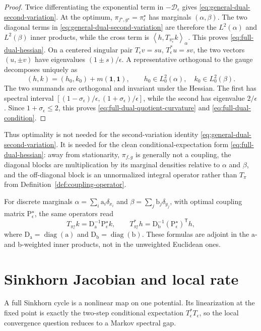 \documentclass[11pt]{article}
\theoremstyle{definition}
\theoremstyle{remark}
\newcommand{\eps}{\epsilon}
\newcommand{\one}{\mathbf{1}}
\newcommand{\al}{\alpha}
\newcommand{\be}{\beta}
\newcommand{\Dd}{\mathcal{D}}
\newcommand{\ip}[2]{\left\langle #1,#2\right\rangle}
\begin{document}
\begin{proof}
Twice differentiating the exponential term in $-\Dd_\eps$ gives
\eqref{eq:general-dual-second-variation}. At the optimum,
$\pi_{f^\star,g^\star}=\pi_\eps^\star$ has marginals $(\al,\be)$.
The two diagonal terms in \eqref{eq:general-dual-second-variation} are
therefore the $L^2(\al)$ and $L^2(\be)$ inner products, while the cross
term is $\ip{h}{T_{\pi_\eps^\star}k}_\al$. This proves
\eqref{eq:full-dual-hessian}. On a centered singular pair
$T_\eps v=s u$, $T_\eps^\ast u=s v$, the two vectors $(u,\pm v)$ have
eigenvalues $(1\pm s)/\eps$. A representative orthogonal to the gauge
decomposes uniquely as
\[
  (h,k)=(h_0,k_0)+m(\one,\one),
  \qquad
  h_0\in L_0^2(\al),\quad k_0\in L_0^2(\be).
\]
The two summands are orthogonal and invariant under the Hessian. The
first has spectral interval
$[(1-\sigma_\eps)/\eps,(1+\sigma_\eps)/\eps]$, while the second has
eigenvalue $2/\eps$. Since $1+\sigma_\eps\leq2$, this proves
\eqref{eq:full-dual-quotient-curvature} and
\eqref{eq:full-dual-condition}.
\end{proof}

Thus optimality is not needed for the second-variation identity
\eqref{eq:general-dual-second-variation}. It is needed for the clean
conditional-expectation form \eqref{eq:full-dual-hessian}: away from
stationarity, $\pi_{f,g}$ is generally not a coupling, the diagonal
blocks are multiplication by its marginal densities relative to
$\al$ and $\be$, and the off-diagonal block is an unnormalized integral
operator rather than $T_\pi$ from Definition~\ref{def:coupling-operator}.

For discrete marginals $\al=\sum_i \mathrm a_i\delta_{x_i}$ and
$\be=\sum_j \mathrm b_j\delta_{y_j}$, with optimal coupling matrix
$\mathrm P_\eps^\star$, the same operators read
\[
  T_{\pi_\eps^\star}k
  =\mathrm D_{\mathrm a}^{-1}\mathrm P_\eps^\star k,
  \qquad
  T_{\pi_\eps^\star}^\ast h
  =\mathrm D_{\mathrm b}^{-1}
  (\mathrm P_\eps^\star)^{\mathsf T}h,
\]
where $\mathrm D_{\mathrm a}=\operatorname{diag}(\mathrm a)$ and
$\mathrm D_{\mathrm b}=\operatorname{diag}(\mathrm b)$. These formulas
are adjoint in the $\mathrm a$- and $\mathrm b$-weighted inner products,
not in the unweighted Euclidean ones.

\section{Sinkhorn Jacobian and local rate}

A full Sinkhorn cycle is a nonlinear map on one potential. Its
linearization at the fixed point is exactly the two-step conditional
expectation $T_\eps^\ast T_\eps$, so the local convergence question reduces to a
Markov spectral gap.
\end{document}
